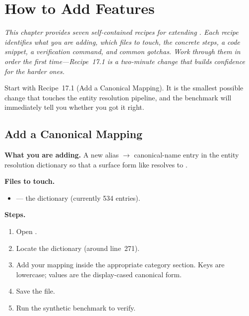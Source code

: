 \chapter{How to Add Features}
\label{ch:how-to-add-features}

\textit{This chapter provides seven self-contained recipes for extending
\sysname{}.  Each recipe identifies what you are adding, which files to
touch, the concrete steps, a code snippet, a verification command, and
common gotchas.  Work through them in order the first time---Recipe~17.1 is
a two-minute change that builds confidence for the harder ones.}

\begin{keyinsight}
Start with Recipe~17.1 (Add a Canonical Mapping).  It is the smallest
possible change that touches the entity resolution pipeline, and the
benchmark will immediately tell you whether you got it right.
\end{keyinsight}

\section{Add a Canonical Mapping}
\label{sec:add-canonical-mapping}

\noindent\textbf{What you are adding.}
A new alias $\rightarrow$ canonical-name entry in the entity resolution
dictionary so that a surface form like  resolves to
.

\medskip\noindent\textbf{Files to touch.}

\begin{itemize}
    \item {} --- the
           dictionary (currently 534 entries).
\end{itemize}

\medskip\noindent\textbf{Steps.}

\begin{enumerate}
    \item Open .
    \item Locate the  dictionary (around line~271).
    \item Add your mapping inside the appropriate category section.  Keys
          are lowercase; values are the display-cased canonical form.
    \item Save the file.
    \item Run the synthetic benchmark to verify.
\end{enumerate}

